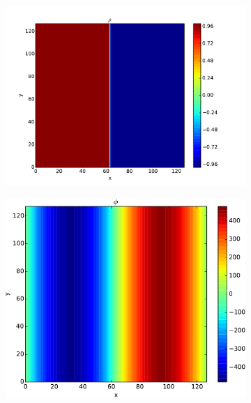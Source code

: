 		\begin{figure}
			\centering
				\begin{subfigure}[b]{0.32\textwidth}
					\includegraphics[width = \textwidth]{figures/verification/heaviside/rho.pdf}
				\end{subfigure}
				\begin{subfigure}[b]{0.32\textwidth}
					\includegraphics[width = \textwidth]{figures/verification/heaviside/phi.pdf}
				\end{subfigure}
				\begin{subfigure}[b]{0.32\textwidth}

\end{subfigure}
\end{figure}
